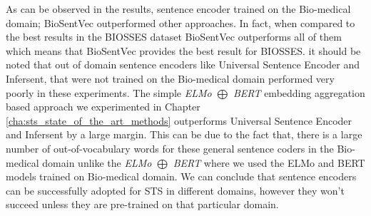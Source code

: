 \begin{table}[htb]
	\centering
	\caption[Results comparison for BIOSSES with different sentence encoders]{Results for BIOSSES dataset with different sentence encoders compared with top results reported for BIOSSES. Additionally, we report the results of the best model from Chapter \ref{cha:sts_state_of_the_art_methods}; \textit{ELMo $\bigoplus$ BERT}. For each variant, Pearson Correlation ($\bm{\rho}$) is reported between the predicted values and the gold labels of the test set. Best result is marked with ${\dagger}$.}  
	\label{tab:biosses_sentence_encoders}
\end{table} 

As can be observed in the results, sentence encoder trained on the Bio-medical domain; BioSentVec \cite{8904728} outperformed other approaches. In fact, when compared to the best results in the BIOSSES dataset BioSentVec outperforms all of them which means that BioSentVec provides the best result for BIOSSES. it should be noted that out of domain sentence encoders like Universal Sentence Encoder and Infersent, that were not trained on the Bio-medical domain performed very poorly in these experiments. The simple \textit{ELMo $\bigoplus$ BERT} embedding aggregation based approach we experimented in Chapter \ref{cha:sts_state_of_the_art_methods} outperforms Universal Sentence Encoder and Infersent by a large margin. This can be due to the fact that, there is a large number of out-of-vocabulary words for these general sentence coders in the Bio-medical domain unlike the \textit{ELMo $\bigoplus$ BERT} where we used the ELMo and BERT models trained on Bio-medical domain. We can conclude that sentence encoders can be successfully adopted for STS in different domains, however they won't succeed unless they are pre-trained on that particular domain. 

